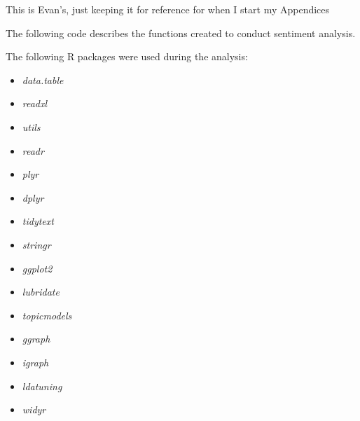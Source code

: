 
This is Evan's, just keeping it for reference for when I start my Appendices 


The following code describes the functions created to conduct sentiment analysis.

The following R packages were used during the analysis:  

\begin{itemize}
\item \emph{data.table} \cite{Dowle2017}
\item \emph{readxl} \cite{Wickham2017}
\item \emph{utils} \cite{Team2017}
\item \emph{readr} \cite{Wickham2017a}
\item \emph{plyr} \cite{Wickham2011}
\item \emph{dplyr} \cite{Wickham2017b}
\item \emph{tidytext} \cite{Silge2016}
\item \emph{stringr} \cite{Wickham2017c}
\item \emph{ggplot2} \cite{Wickham2009}
\item \emph{lubridate} \cite{Grolemund2011}
\item \emph{topicmodels} \cite{Grun2011}
\item \emph{ggraph} \cite{Pedersen2017}
\item \emph{igraph} \cite{Csardi2006}
\item \emph{ldatuning} \cite{Nikita2016}
\item \emph{widyr} \cite{Robinson2017}
\end{itemize}






